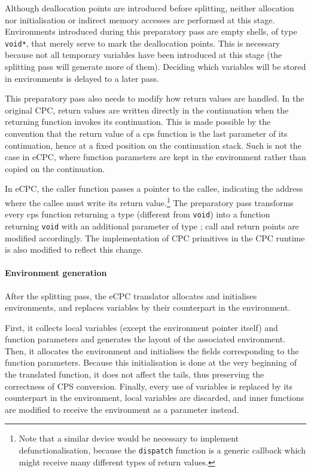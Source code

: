 \documentclass[a4paper]{llncs}
\begin{document}
Although deallocation points are introduced before splitting, neither allocation
nor initialisation or indirect memory accesses are performed at this stage.
Environments introduced during this preparatory pass are empty shells, of type
\texttt{void*}, that merely serve to mark the deallocation points.  This is
necessary because not all temporary variables have been introduced at this
stage (the splitting pass will generate more of them).  Deciding which variables
will be stored in environments is delayed to a later pass.

This preparatory pass also needs to modify how return values are handled.  In
the original CPC, return values are written directly in the continuation when
the returning function invokes its continuation.  This is made possible by the
convention that the return value of a cps function is the last parameter of its
continuation, hence at a fixed position on the continuation stack.  Such is not
the case in eCPC, where function parameters are kept in the environment rather
than copied on the continuation.

In eCPC, the caller function passes a pointer to the callee, indicating the
address where the callee must write its return value.\footnote{Note that a
similar device would be necessary to implement defunctionalisation, because the
\texttt{dispatch} function is a generic callback which might receive many
different types of return values.} The preparatory pass transforms every cps
function returning a type  (different from \texttt{void}) into a function
returning \texttt{void} with an additional parameter of type ; call and return
points are modified accordingly.  The implementation of CPC primitives in the
CPC runtime is also modified to reflect this change.

\paragraph{Environment generation}

After the splitting pass, the eCPC translator allocates and initialises
environments, and replaces variables by their counterpart in the environment.

First, it collects local variables (except the environment pointer itself) and
function parameters and generates the layout of the associated environment.
Then, it allocates the environment and initialises the fields corresponding to
the function parameters.  Because this initialisation is done at the very
beginning of the translated function, it does not affect the tails, thus
preserving the correctness of CPS conversion.  Finally, every use of variables
is replaced by its counterpart in the environment, local variables are
discarded, and inner functions are modified to receive the environment as a
parameter instead.
\end{document}
